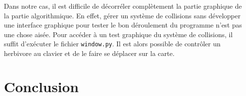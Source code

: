 \documentclass[a4paper,11pt,final,oneside]{article}
\begin{document}
Dans notre cas, il est difficile de décorréler complètement la partie graphique de la partie algorithmique. En effet, gérer un système de collisions sans développer une interface graphique pour tester le bon déroulement du programme n'est pas une chose aisée. Pour accéder à un test graphique du système de collisions, il suffit d'exécuter le fichier \texttt{window.py}. Il est alors possible de contrôler un herbivore au clavier et de le faire se déplacer sur la carte.

\newpage
	\section*{Conclusion}

\paragraph{} 
\end{document}
